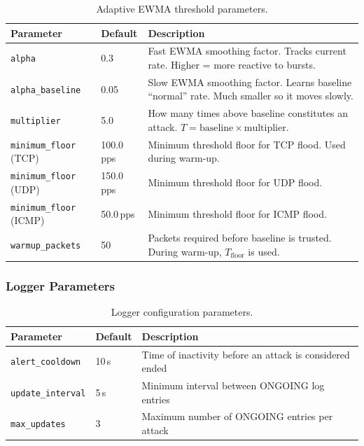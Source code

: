 \documentclass[12pt,a4paper]{article}
\begin{document}
\begin{table}[H]
\centering
\caption{Adaptive EWMA threshold parameters.}
\label{tab:ewma_params}
\begin{tabular}{llp{6.5cm}}
\toprule
\textbf{Parameter} & \textbf{Default} & \textbf{Description} \\
\midrule
\texttt{alpha}              & 0.3      & Fast EWMA smoothing factor. Tracks current rate. Higher = more reactive to bursts. \\
\texttt{alpha\_baseline}    & 0.05     & Slow EWMA smoothing factor. Learns baseline ``normal'' rate. Much smaller so it moves slowly. \\
\texttt{multiplier}         & 5.0      & How many times above baseline constitutes an attack. $T = \text{baseline} \times \text{multiplier}$. \\
\texttt{minimum\_floor} (TCP)  & 100.0\,pps  & Minimum threshold floor for TCP flood. Used during warm-up. \\
\texttt{minimum\_floor} (UDP)  & 150.0\,pps  & Minimum threshold floor for UDP flood. \\
\texttt{minimum\_floor} (ICMP) & 50.0\,pps   & Minimum threshold floor for ICMP flood. \\
\texttt{warmup\_packets}    & 50       & Packets required before baseline is trusted. During warm-up, $T_{\text{floor}}$ is used. \\
\bottomrule
\end{tabular}
\end{table}

\subsubsection{Logger Parameters}

\begin{table}[H]
\centering
\caption{Logger configuration parameters.}
\label{tab:logger_params}
\begin{tabular}{llp{6.5cm}}
\toprule
\textbf{Parameter} & \textbf{Default} & \textbf{Description} \\
\midrule
\texttt{alert\_cooldown}   & 10\,s & Time of inactivity before an attack is considered ended \\
\texttt{update\_interval}  & 5\,s  & Minimum interval between ONGOING log entries \\
\texttt{max\_updates}      & 3     & Maximum number of ONGOING entries per attack \\
\bottomrule
\end{tabular}
\end{table}
\end{document}
